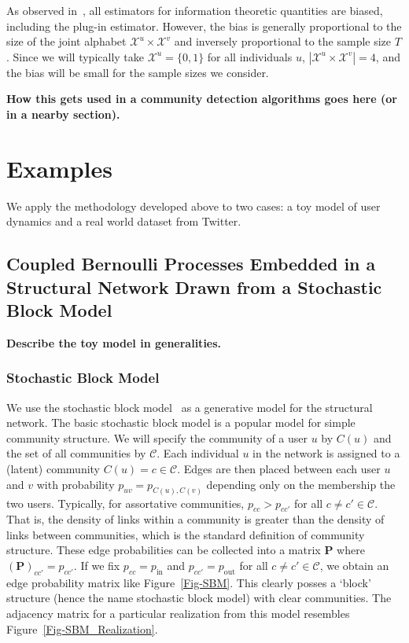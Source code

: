 \documentclass[12pt]{article}
\begin{document}
As observed in~\cite{paninski2003estimation}, all estimators for information theoretic quantities are biased, including the plug-in estimator. However, the bias is generally proportional to the size of the joint alphabet $\mathcal{X}^{u} \times \mathcal{X}^{v}$ and inversely proportional to the sample size $T$. Since we will typically take $\mathcal{X}^{u} = \{0, 1\}$ for all individuals $u$, $|\mathcal{X}^{u} \times \mathcal{X}^{v}| = 4$, and the bias will be small for the sample sizes we consider.

\textbf{How this gets used in a community detection algorithms goes here (or in a nearby section).}

\section{Examples}

We apply the methodology developed above to two cases: a toy model of user dynamics and a real world dataset from Twitter.

\subsection{Coupled Bernoulli Processes Embedded in a Structural Network Drawn from a Stochastic Block Model}

\textbf{Describe the toy model in generalities.}

\subsubsection{Stochastic Block Model}

\label{Sec-SBM}

We use the stochastic block model~\cite{holland1983stochastic} as a generative model for the structural network. The basic stochastic block model is a popular model for simple community structure. We will specify the community of a user $u$ by $C(u)$ and the set of all communities by $\mathcal{C}$. Each individual $u$ in the network is assigned to a (latent) community $C(u) = c \in \mathcal{C}$. Edges are then placed between each user $u$ and $v$ with probability $p_{uv} = p_{C(u), C(v)}$ depending only on the membership the two users. Typically, for assortative communities, $p_{cc} > p_{cc'}$ for all $c \neq c' \in \mathcal{C}$. That is, the density of links within a community is greater than the density of links between communities, which is the standard definition of community structure. These edge probabilities can be collected into a matrix $\mathbf{P}$ where $(\mathbf{P})_{cc'} = p_{cc'}.$ If we fix $p_{cc} = p_{\text{in}}$ and $p_{cc'} = p_{\text{out}}$ for all $c \neq c' \in \mathcal{C}$, we obtain an edge probability matrix like Figure~\ref{Fig-SBM}. This clearly posses a `block' structure (hence the name stochastic block model) with clear communities. The adjacency matrix for a particular realization from this model resembles Figure~\ref{Fig-SBM_Realization}.
\end{document}
